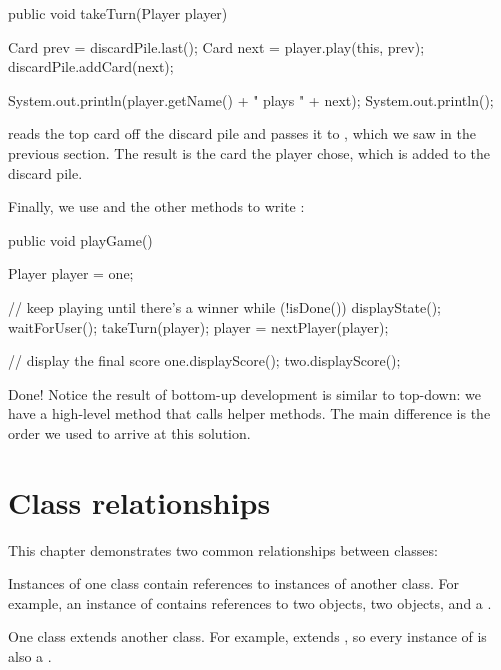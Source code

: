 \begin{code}
public void takeTurn(Player player) {
    Card prev = discardPile.last();
    Card next = player.play(this, prev);
    discardPile.addCard(next);

    System.out.println(player.getName() + " plays " + next);
    System.out.println();
}
\end{code}

 reads the top card off the discard pile and passes it to , which we saw in the previous section.
The result is the card the player chose, which is added to the discard pile.

Finally, we use  and the other methods to write :

\begin{code}
public void playGame() {
    Player player = one;

    // keep playing until there's a winner
    while (!isDone()) {
        displayState();
        waitForUser();
        takeTurn(player);
        player = nextPlayer(player);
    }

    // display the final score
    one.displayScore();
    two.displayScore();
}
\end{code}

Done!
Notice the result of bottom-up development is similar to top-down: we have a high-level method that calls helper methods.
The main difference is the order we used to arrive at this solution.


\section{Class relationships}

This chapter demonstrates two common relationships between classes:

\begin{description}

Instances of one class contain references to instances of another class.
For example, an instance of  contains references to two  objects, two  objects, and a .

One class extends another class.
For example,  extends , so every instance of  is also a .

\end{description}


